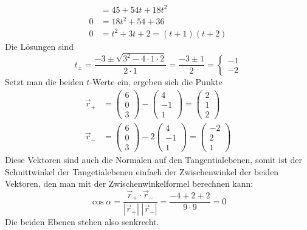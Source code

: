 \begin{loesung}
\begin{align*}
&=45+54t+18t^2
\\
0&=18t^2+54+36
\\
0&=t^2+3t+2=(t+1)(t+2)
\end{align*}
Die Lösungen sind
\[
t_{\pm}=\frac{-3\pm\sqrt{3^2-4\cdot1\cdot 2}}{2\cdot 1}
=\frac{-3\pm1}{2}
=\begin{cases}
-1\\
-2
\end{cases}
\]
Setzt man die beiden $t$-Werte ein, ergeben sich die Punkte
\begin{align*}
\vec r_+&=
\begin{pmatrix}6\\0\\3\end{pmatrix}
-
\begin{pmatrix}4\\-1\\1\end{pmatrix}
=
\begin{pmatrix}2\\1\\2\end{pmatrix}
\\
\vec r_-&=
\begin{pmatrix}6\\0\\3\end{pmatrix}
-2
\begin{pmatrix}4\\-1\\1\end{pmatrix}
=
\begin{pmatrix}-2\\2\\1\end{pmatrix}
\end{align*}
Diese Vektoren sind auch die Normalen auf den Tangentialebenen,
somit ist der Schnittwinkel der Tangetialebenen einfach der
Zwischenwinkel der beiden Vektoren, den man mit der Zwischenwinkelformel
berechnen kann:
\[
\cos \alpha=
\frac{\vec r_+\cdot\vec r_-} {|\vec r_+|\;|\vec r_-|}
=\frac{-4+2+2}{9\cdot 9}=0
\]
Die beiden Ebenen stehen also senkrecht.
\end{loesung}


